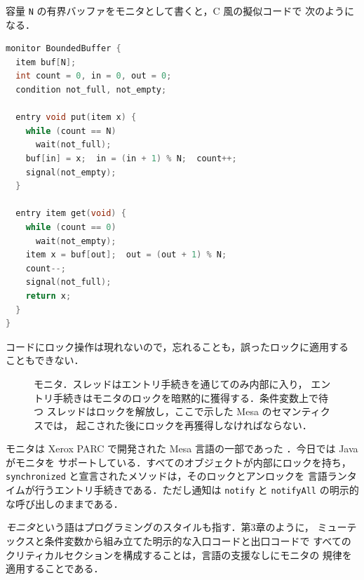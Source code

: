 \documentclass[../main.tex]{subfiles}
\begin{document}
\begin{example}
  容量 \texttt{N} の有界バッファをモニタとして書くと，C 風の擬似コードで
  次のようになる．
  \begin{lstlisting}[language=C, numbers=none]
monitor BoundedBuffer {
  item buf[N];
  int count = 0, in = 0, out = 0;
  condition not_full, not_empty;

  entry void put(item x) {
    while (count == N)
      wait(not_full);
    buf[in] = x;  in = (in + 1) % N;  count++;
    signal(not_empty);
  }

  entry item get(void) {
    while (count == 0)
      wait(not_empty);
    item x = buf[out];  out = (out + 1) % N;
    count--;
    signal(not_full);
    return x;
  }
}
\end{lstlisting}
  コードにロック操作は現れないので，忘れることも，誤ったロックに適用する
  こともできない．
\end{example}

\begin{figure}[htbp]
  \centering
  
  \caption{モニタ．スレッドはエントリ手続きを通じてのみ内部に入り，
    エントリ手続きはモニタのロックを暗黙的に獲得する．条件変数上で待つ
    スレッドはロックを解放し，ここで示した Mesa のセマンティクスでは，
    起こされた後にロックを再獲得しなければならない．}
  \label{fig:l10-monitor}
\end{figure}

モニタは Xerox PARC で開発された Mesa 言語の一部であった
\cite{lampson1980}．今日では Java がモニタを
サポートしている．すべてのオブジェクトが内部にロックを持ち，
\texttt{synchronized} と宣言されたメソッドは，そのロックとアンロックを
言語ランタイムが行うエントリ手続きである．ただし通知は \texttt{notify} と
\texttt{notifyAll} の明示的な呼び出しのままである．

\emph{モニタ}という語はプログラミングのスタイルも指す．第3章のように，
ミューテックスと条件変数から組み立てた明示的な入口コードと出口コードで
すべてのクリティカルセクションを構成することは，言語の支援なしにモニタの
規律を適用することである．
\end{document}
